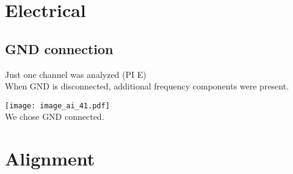 \section{Electrical}
\subsection{GND connection}
 Just one channel was analyzed (PI E)\\
 When GND is {\color{green}disconnected}, additional frequency components were present.\par
\texttt{[image: image\_ai\_41.pdf]}\\
We chose {\color{blue}GND connected}.\par

\section{Alignment}
